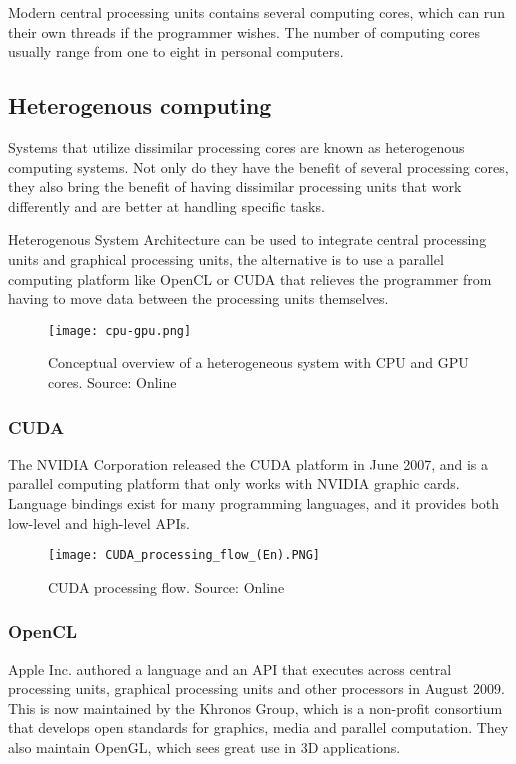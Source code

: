 Modern central processing units contains several computing cores, which can run their own threads if the programmer wishes. The number of computing cores usually range from one to eight in personal computers.

\subsection{Heterogenous computing}
Systems that utilize dissimilar processing cores are known as heterogenous computing systems. Not only do they have the benefit of several processing cores, they also bring the benefit of having dissimilar processing units that work differently and are better at handling specific tasks.

Heterogenous System Architecture can be used to integrate central processing units and graphical processing units, the alternative is to use a parallel computing platform like OpenCL or CUDA that relieves the programmer from having to move data between the processing units themselves.

\begin{figure}[ht]
    \centering
    \texttt{[image: cpu-gpu.png]}
    \caption{Conceptual overview of a heterogeneous system with CPU and GPU cores. Source: Online \citet{cpugpu13}}
    \label{fig:cpu-gpu.png}
\end{figure}
\FloatBarrier

\subsubsection{CUDA}
The NVIDIA Corporation released the CUDA platform in June 2007, and is a parallel computing platform that only works with NVIDIA graphic cards. Language bindings exist for many programming languages, and it provides both low-level and high-level APIs.

\begin{figure}[ht]
    \centering
    \texttt{[image: CUDA\_processing\_flow\_(En).PNG]}
    \caption{CUDA processing flow. Source: Online \citet{wikicuda15}}
    \label{fig:CUDA_processing_flow_(En)}
\end{figure}
\FloatBarrier

\subsubsection{OpenCL}
Apple Inc. authored a language and an API that executes across central processing units, graphical processing units and other processors in August 2009. This is now maintained by the Khronos Group, which is a non-profit consortium that develops open standards for graphics, media and parallel computation. They also maintain OpenGL, which sees great use in 3D applications.

